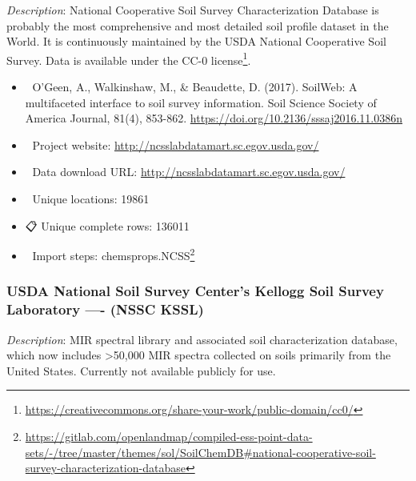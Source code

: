 \documentclass[
  graybox,natbib,nospthms]{svmono}
\providecommand{\tightlist}{%
  \setlength{\itemsep}{0pt}\setlength{\parskip}{0pt}}
\providecommand{\tightlist}{\setlength{\itemsep}{0pt}\setlength{\parskip}{0pt}}
\renewcommand{\href}[2]{#2 (\url{#1})}
\renewcommand{\href}[2]{#2\footnote{\url{#1}}}
\begin{document}
\emph{Description}: National Cooperative Soil Survey Characterization Database is probably
the most comprehensive and most detailed soil profile dataset in the World. It is continuously
maintained by the USDA National Cooperative Soil Survey. Data is available under the
\href{https://creativecommons.org/share-your-work/public-domain/cc0/}{CC-0 license}.

\begin{itemize}
\tightlist
\item
  📕 O'Geen, A., Walkinshaw, M., \& Beaudette, D. (2017). SoilWeb: A multifaceted interface to soil survey information. Soil Science Society of America Journal, 81(4), 853-862. \url{https://doi.org/10.2136/sssaj2016.11.0386n}\\
\item
  🔗 Project website: \url{http://ncsslabdatamart.sc.egov.usda.gov/}\\
\item
  📂 Data download URL: \url{http://ncsslabdatamart.sc.egov.usda.gov/}\\
\item
  📍 Unique locations: 19861\\
\item
  📋 Unique complete rows: 136011\\
\item
  📝 Import steps: \href{https://gitlab.com/openlandmap/compiled-ess-point-data-sets/-/tree/master/themes/sol/SoilChemDB\#national-cooperative-soil-survey-characterization-database}{chemsprops.NCSS}
\end{itemize}

\hypertarget{usda-national-soil-survey-centers-kellogg-soil-survey-laboratory---nssc-kssl}{%
\subsubsection{USDA National Soil Survey Center's Kellogg Soil Survey Laboratory ---- (NSSC KSSL)}\label{usda-national-soil-survey-centers-kellogg-soil-survey-laboratory---nssc-kssl}}

\emph{Description}: MIR spectral library and associated soil characterization database, which now
includes \textgreater50,000 MIR spectra collected on soils primarily from the United States. Currently not available publicly for use.
\end{document}
